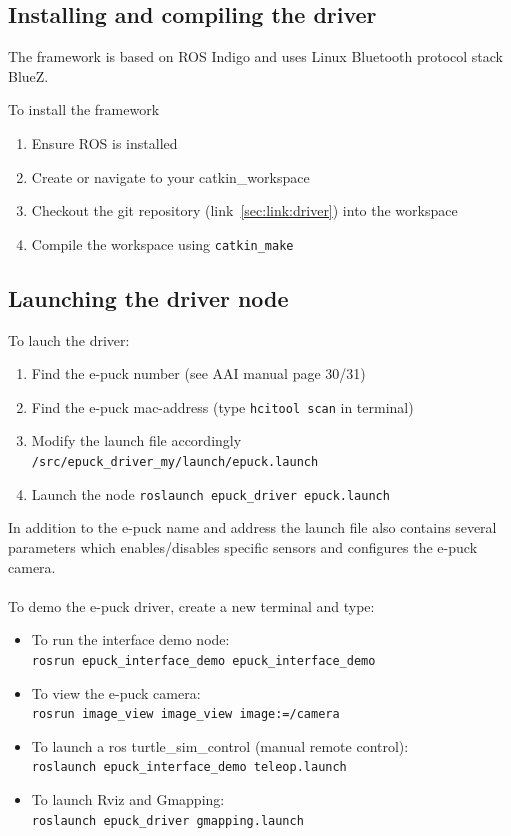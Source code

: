 \documentclass{article}
\newcommand{\stt}[1]{{\small\tt #1}}
\begin{document}
\newpage
\subsection{Installing and compiling the driver}
The framework is based on ROS Indigo and uses Linux Bluetooth protocol stack BlueZ. 

To install the framework
\begin{enumerate}
\item Ensure ROS is installed
\item Create or navigate to your catkin\_workspace
\item Checkout the git repository (link~\ref{sec:link:driver}) into the workspace
\item Compile the workspace using \stt{catkin\_make}
\end{enumerate}

\subsection{Launching the driver node}
To lauch the driver:
\begin{enumerate}
\item Find the e-puck number (see AAI manual page 30/31)
\item Find the e-puck mac-address (type \stt{hcitool scan} in terminal)
\item Modify the launch file accordingly \stt{/src/epuck\_driver\_my/launch/epuck.launch}
\item Launch the node \stt{roslaunch epuck\_driver epuck.launch}
\end{enumerate}

\noindent
In addition to the e-puck name and address the launch file also contains several parameters which enables/disables specific sensors and configures the e-puck camera.
\\
\\
To demo the e-puck driver, create a new terminal and type:
\begin{itemize}
\item To run the interface demo node: 
\\\stt{rosrun epuck\_interface\_demo epuck\_interface\_demo} 
\item To view the e-puck camera: 
\\\stt{rosrun image\_view image\_view image:=/camera} 
\item To launch a ros turtle\_sim\_control (manual remote control):
\\\stt{roslaunch epuck\_interface\_demo teleop.launch}
\item To launch Rviz and Gmapping:
\\\stt{roslaunch epuck\_driver gmapping.launch}
\end{itemize}
\end{document}
